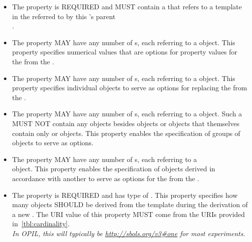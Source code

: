 \begin{itemize}
\item \label{sec:sbol:variable}
The  property is REQUIRED and MUST contain a  that refers to a template  in the   referred to by this 's parent \\ .

\item \label{sec:sbol:variantMeasure}
The  property MAY have any number of s, each referring to a  object. This property specifies numerical values that are options for  property values for the   from the .

\item \label{sec:sbol:variant}
The  property MAY have any number of s, each referring to a  object. This property specifies individual  objects to serve as options for replacing the   from the .

\item \label{sec:sbol:variantCollection}
The  property MAY have any number of s, each referring to a  object.
Such a  MUST NOT contain any objects besides  objects or  objects that themselves contain only  or  objects.
This property enables the specification of groups of  objects to serve as options.

\item \label{sec:sbol:variantDerivation}
The  property MAY have any number of s, each referring to a \\  object. 
This property enables the specification of  objects derived in accordance with another  to serve as options for the   from the . 

\item \label{sec:sbol:cardinality}
The  property is REQUIRED and has type of . This property specifies how many  objects SHOULD be derived from the template  during the derivation of a new . The URI value of this property MUST come from the URIs provided in~\ref{tbl:cardinality}.
\\{\em In OPIL, this will typically be \url{http://sbols.org/v3#one} for most experiments.}


\end{itemize}

